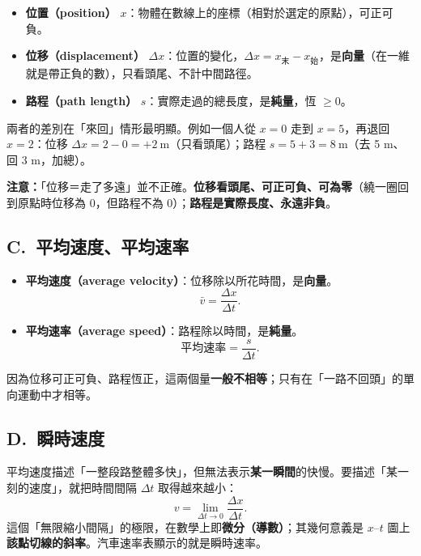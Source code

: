 \documentclass[11pt]{article}
\begin{document}
\begin{itemize}\setlength{\itemsep}{2pt}
\item \textbf{位置（position）} $x$：物體在數線上的座標（相對於選定的原點），可正可負。
\item \textbf{位移（displacement）} $\Delta x$：位置的變化，$\Delta x = x_{\text{末}} - x_{\text{始}}$，是\textbf{向量}（在一維就是帶正負的數），只看頭尾、不計中間路徑。
\item \textbf{路程（path length）} $s$：實際走過的總長度，是\textbf{純量}，恆 $\ge 0$。
\end{itemize}

兩者的差別在「來回」情形最明顯。例如一個人從 $x=0$ 走到 $x=5$，再退回 $x=2$：位移 $\Delta x = 2-0 = +2\ \text{m}$（只看頭尾）；路程 $s = 5+3 = 8\ \text{m}$（去 5 m、回 3 m，加總）。

\textbf{注意：}「位移＝走了多遠」並不正確。\textbf{位移看頭尾、可正可負、可為零}（繞一圈回到原點時位移為 0，但路程不為 0）；\textbf{路程是實際長度、永遠非負}。

\subsection*{\sffamily C.\ 平均速度、平均速率}

\begin{itemize}\setlength{\itemsep}{2pt}
\item \textbf{平均速度（average velocity）}：位移除以所花時間，是\textbf{向量}。
$$\bar v = \frac{\Delta x}{\Delta t}.$$
\item \textbf{平均速率（average speed）}：路程除以時間，是\textbf{純量}。
$$\text{平均速率} = \frac{s}{\Delta t}.$$
\end{itemize}

因為位移可正可負、路程恆正，這兩個量\textbf{一般不相等}；只有在「一路不回頭」的單向運動中才相等。

\subsection*{\sffamily D.\ 瞬時速度}

平均速度描述「一整段路整體多快」，但無法表示\textbf{某一瞬間}的快慢。要描述「某一刻的速度」，就把時間間隔 $\Delta t$ 取得越來越小：
$$v = \lim_{\Delta t \to 0} \frac{\Delta x}{\Delta t}.$$
這個「無限縮小間隔」的極限，在數學上即\textbf{微分（導數）}；其幾何意義是 $x\text{–}t$ 圖上\textbf{該點切線的斜率}。汽車速率表顯示的就是瞬時速率。
\end{document}
